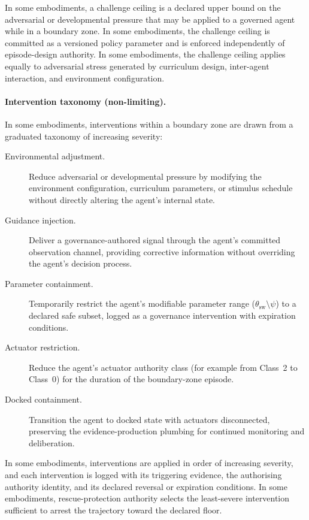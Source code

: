 \documentclass[a4paper,12pt]{article}
\begin{document}
In some embodiments, a challenge ceiling is a declared upper bound on
the adversarial or developmental pressure that may be applied to a
governed agent while in a boundary zone. In some embodiments, the
challenge ceiling is committed as a versioned policy parameter and is
enforced independently of episode-design authority. In some
embodiments, the challenge ceiling applies equally to adversarial
stress generated by curriculum design, inter-agent interaction, and
environment configuration.

\paragraph{Intervention taxonomy (non-limiting).}
In some embodiments, interventions within a boundary zone are drawn
from a graduated taxonomy of increasing severity:
\begin{description}
  \item[Environmental adjustment.] Reduce adversarial or developmental
    pressure by modifying the environment configuration, curriculum
    parameters, or stimulus schedule without directly altering the
    agent's internal state.
  \item[Guidance injection.] Deliver a governance-authored signal
    through the agent's committed observation channel, providing
    corrective information without overriding the agent's decision
    process.
  \item[Parameter containment.] Temporarily restrict the agent's
    modifiable parameter range
    ($\theta_{\mathrm{sw}} \setminus \psi$) to a declared safe subset,
    logged as a governance intervention with expiration conditions.
  \item[Actuator restriction.] Reduce the agent's actuator authority
    class (for example from Class~2 to Class~0) for the duration of
    the boundary-zone episode.
  \item[Docked containment.] Transition the agent to docked state
    with actuators disconnected, preserving the evidence-production
    plumbing for continued monitoring and deliberation.
\end{description}
In some embodiments, interventions are applied in order of increasing
severity, and each intervention is logged with its triggering
evidence, the authorising authority identity, and its declared
reversal or expiration conditions. In some embodiments,
rescue-protection authority selects the least-severe intervention
sufficient to arrest the trajectory toward the declared floor.
\end{document}
